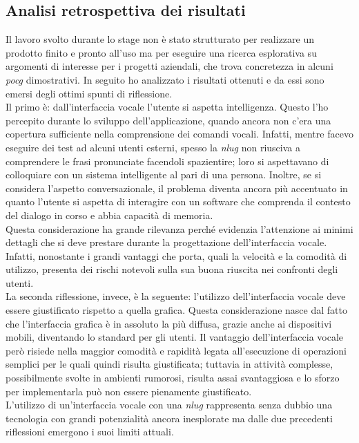 \subsection{Analisi retrospettiva dei risultati}
Il lavoro svolto durante lo stage non è stato strutturato per realizzare un prodotto finito e pronto all'uso ma per eseguire una ricerca esplorativa su argomenti di interesse per i progetti aziendali, che trova concretezza in alcuni \emph{\gls{pocg}} dimostrativi. In seguito ho analizzato i risultati ottenuti e da essi sono emersi degli ottimi spunti di riflessione. \\
Il primo è: dall'interfaccia vocale l'utente si aspetta intelligenza. Questo l'ho percepito durante lo sviluppo dell'applicazione, quando ancora non c'era una copertura sufficiente nella comprensione dei comandi vocali. Infatti, mentre facevo eseguire dei test ad alcuni utenti esterni, spesso la \emph{\gls{nlug}} non riusciva a comprendere le frasi pronunciate facendoli spazientire; loro si aspettavano di colloquiare con un sistema intelligente al pari di una persona. Inoltre, se si considera l'aspetto conversazionale, il problema diventa ancora più accentuato in quanto l'utente si aspetta di interagire con un software che comprenda il contesto del dialogo in corso e abbia capacità di memoria. \\
Questa considerazione ha grande rilevanza perché evidenzia l'attenzione ai minimi dettagli che si deve prestare durante la progettazione dell'interfaccia vocale. Infatti, nonostante i grandi vantaggi che porta, quali la velocità e la comodità di utilizzo, presenta dei rischi notevoli sulla sua buona riuscita nei confronti degli utenti. \\
La seconda riflessione, invece, è la seguente: l'utilizzo dell'interfaccia vocale deve essere giustificato rispetto a quella grafica. Questa considerazione nasce dal fatto che l'interfaccia grafica è in assoluto la più diffusa, grazie anche ai dispositivi mobili, diventando lo standard per gli utenti. Il vantaggio dell'interfaccia vocale però risiede nella maggior comodità e rapidità legata all'esecuzione di operazioni semplici per le quali quindi risulta giustificata; tuttavia in attività complesse, possibilmente svolte in ambienti rumorosi, risulta assai svantaggiosa e lo sforzo per implementarla può non essere pienamente giustificato. \\
L'utilizzo di un'interfaccia vocale con una \emph{\gls{nlug}} rappresenta senza dubbio una tecnologia con grandi potenzialità ancora inesplorate ma dalle due precedenti riflessioni emergono i suoi limiti attuali. \\

